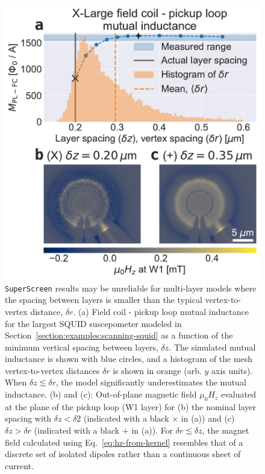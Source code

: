 \documentclass[final,3p,times,twocolumn]{elsarticle}
\newcommand{\inline}[1]{\texttt{#1}\xspace}
\newcommand{\SuperScreen}{\inline{SuperScreen}}
\newcounter{bla}
\begin{document}
\begin{figure}
    \centering
    \includegraphics[width=\linewidth]{examples/images/xlarge-dz-dr.pdf}
    \caption{\SuperScreen results may be unreliable for multi-layer models where the spacing between layers is smaller than the typical vertex-to-vertex distance, $\delta r$. (a) Field coil - pickup loop mutual inductance for the largest SQUID suscepometer modeled in Section~\ref{section:examples:scanning-squid} as a function of the minimum vertical spacing between layers, $\delta z$. The simulated mutual inductance is shown with blue circles, and a histogram of the mesh vertex-to-vertex distances $\delta r$ is shown in orange (arb. $y$ axis units). When $\delta z\lesssim\delta r$, the model significantly underestimates the mutual inductance. (b) and (c): Out-of-plane magnetic field $\mu_0H_z$ evaluated at the plane of the pickup loop (W1 layer) for (b) the nominal layer spacing with $\delta z<\delta 2$ (indicated with a black $\times$ in (a)) and (c) $\delta z > \delta r$ (indicated with a black $+$ in (a)). For $\delta r\lesssim\delta z$, the magnet field calculated using Eq.~\ref{eq:hz-from-kernel} resembles that of a discrete set of isolated dipoles rather than a continuous sheet of current.}
    \label{fig:xlarge-dz-dr}
\end{figure}
\end{document}
